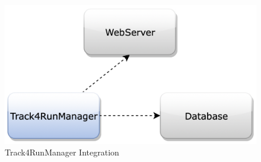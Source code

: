 \begin{figure}[H]
\centering
\includegraphics[scale=0.35]{Images/IntegrationPlanImages/fig4.png}
\caption{Track4RunManager Integration}
\end{figure}

